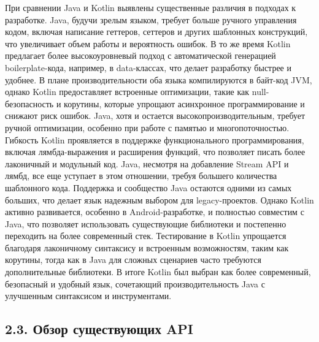 \documentclass{vsureport}
\begin{document}
При сравнении Java и Kotlin выявлены существенные различия в подходах к разработке. Java, будучи зрелым языком, требует больше ручного управления кодом, включая написание геттеров, сеттеров и других шаблонных конструкций, что увеличивает объем работы и вероятность ошибок. В то же время Kotlin предлагает более высокоуровневый подход с автоматической генерацией boilerplate-кода, например, в data-классах, что делает разработку быстрее и удобнее.
В плане производительности оба языка компилируются в байт-код JVM, однако Kotlin предоставляет встроенные оптимизации, такие как null-безопасность и корутины, которые упрощают асинхронное программирование и снижают риск ошибок. Java, хотя и остается высокопроизводительным, требует ручной оптимизации, особенно при работе с памятью и многопоточностью.
Гибкость Kotlin проявляется в поддержке функционального программирования, включая лямбда-выражения и расширения функций, что позволяет писать более лаконичный и модульный код. Java, несмотря на добавление Stream API и лямбд, все еще уступает в этом отношении, требуя большего количества шаблонного кода.
Поддержка и сообщество Java остаются одними из самых больших, что делает язык надежным выбором для legacy-проектов. Однако Kotlin активно развивается, особенно в Android-разработке, и полностью совместим с Java, что позволяет использовать существующие библиотеки и постепенно переходить на более современный стек.
Тестирование в Kotlin упрощается благодаря лаконичному синтаксису и встроенным возможностям, таким как корутины, тогда как в Java для сложных сценариев часто требуются дополнительные библиотеки. 
В итоге Kotlin был выбран как более современный, безопасный и удобный язык, сочетающий производительность Java с улучшенным синтаксисом и инструментами.

\subsection*{2.3. Обзор существующих API}
\end{document}
